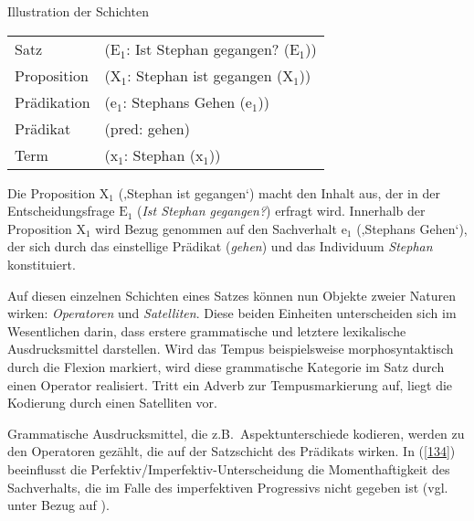 \noindent\parbox{\textwidth}{\begin{exe}
	\ex\label{133}
	Illustration der Schichten\\
	\begin{tabular}[t]{@{}ll}
  	Satz & ($\textrm{{E}}_{\textrm{1}}$: Ist Stephan gegangen? ($\textrm{{E}}_{\textrm{1}}$))\\
  	Proposition & ($\textrm{X}_{\textrm{1}}$: Stephan ist gegangen ($\textrm{X}_{\textrm{1}}$))\\
  	Prädikation & ($\textrm{e}_{\textrm{1}}$: Stephans Gehen ($\textrm{e}_{\textrm{1}}$))\\
	Prädikat & (pred: gehen)\\
	Term & ($\textrm{x}_{\textrm{1}}$: Stephan ($\textrm{x}_{\textrm{1}}$))\\  	
\end{tabular}
\end{exe}}
Die Proposition $\textrm{X}_{\textrm{1}}$ (‚Stephan ist gegangen‘) macht den Inhalt aus, der in der Entscheidungsfrage $\textrm{{E}}_{\textrm{1}}$ (\textit{Ist Stephan gegangen?}) erfragt wird. Innerhalb der Proposition $\textrm{X}_{\textrm{1}}$ wird Bezug genommen auf den Sachverhalt $\textrm{e}_{\textrm{1}}$ (‚Stephans Gehen‘), der sich durch das einstellige Prädikat (\textit{gehen}) und das Individuum \textit{Stephan} konstituiert.

\noindent
Auf diesen einzelnen Schichten eines Satzes können nun Objekte zweier Naturen wirken: \textit{Operatoren} und \textit{Satelliten}. Diese beiden Einheiten unterscheiden sich im Wesentlichen darin, dass erstere grammatische und letztere lexikalische Ausdrucksmittel darstellen. Wird das Tempus beispielsweise morphosyntaktisch durch die Flexion markiert, wird diese grammatische Kategorie im Satz durch einen Operator realisiert. Tritt ein Adverb zur Tempusmarkierung auf, liegt die Kodierung durch einen Satelliten vor.

Grammatische Ausdrucksmittel, die z.B.\ Aspektunterschiede kodieren, werden zu den Operatoren gezählt, die auf der Satzschicht des Prädikats wirken. In (\ref{134}) beeinflusst die Perfektiv/Imperfektiv-Unterscheidung die Momenthaftigkeit des Sachverhalts, die im Falle des imperfektiven Progressivs nicht gegeben ist (vgl.\ \citealt[134]{Hengeveld1989} unter Bezug auf \citealt[43]{Comrie1976}). 

